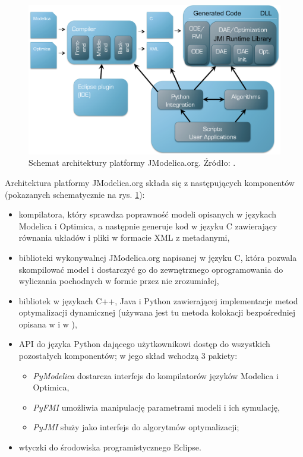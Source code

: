\begin{figure}[htp]
    \centering
    \includegraphics[width=\textwidth]{Grafika/jmodelica_architecture}
    \caption{Schemat architektury platformy JModelica.org. Źródło: \cite{JModelicaWebsite}.}
    \label{fig:jmodelicaarchitecture}
\end{figure}

Architektura platformy JModelica.org składa się z następujących komponentów (pokazanych schematycznie na rys. \ref{fig:jmodelicaarchitecture}):
\begin{itemize}
    \item kompilatora, który sprawdza poprawność modeli opisanych w językach Modelica i Optimica, a następnie generuje kod w języku C zawierający równania układów i pliki w formacie XML z metadanymi,
    \item biblioteki wykonywalnej JModelica.org napisanej w języku C, która pozwala skompilować model i dostarczyć go do zewnętrznego oprogramowania do wyliczania pochodnych w formie przez nie zrozumiałej,
    \item bibliotek w językach C++, Java i Python zawierającej implementacje metod optymalizacji dynamicznej (używana jest tu metoda kolokacji bezpośredniej opisana w \cite{ake+10cace} i w \cite{and+11mod11}),
    \item API do języka Python dającego użytkownikowi dostęp do wszystkich pozostałych komponentów; w jego skład wchodzą 3 pakiety:
    \begin{itemize}
        \item \emph{PyModelica} dostarcza interfejs do kompilatorów języków Modelica i Optimica,
        \item \emph{PyFMI} umożliwia manipulację parametrami modeli i ich symulację,
        \item \emph{PyJMI} służy jako interfejs do algorytmów optymalizacji;
    \end{itemize}
    \item wtyczki do środowiska programistycznego Eclipse.
\end{itemize}

